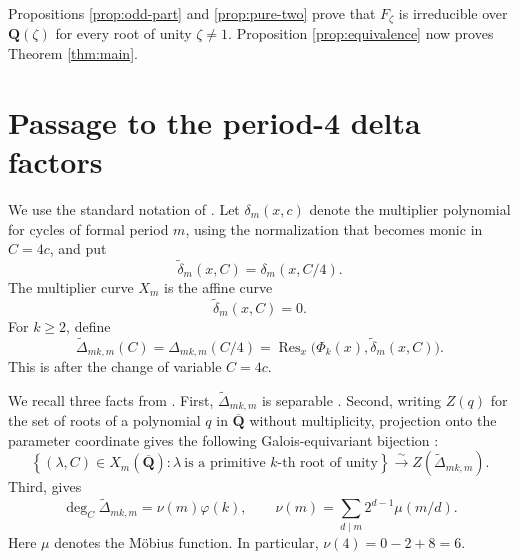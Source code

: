 \documentclass[11pt]{article}
\newcommand{\Q}{\mathbf Q}
\newcommand{\Res}{\operatorname{Res}}
\begin{document}
Propositions \ref{prop:odd-part} and \ref{prop:pure-two} prove that
$F_\zeta$ is irreducible over $\Q(\zeta)$ for every root of unity
$\zeta\neq1$.  Proposition \ref{prop:equivalence} now proves
Theorem \ref{thm:main}.

\section{Passage to the period-4 delta factors}

We use the standard notation of
\cite{Morton1996,MortonVivaldi1995,KoizumiMurakamiSanoTakehira2025}.  Let
$\delta_m(x,c)$ denote the multiplier polynomial for cycles of formal
period $m$, using the normalization that becomes monic in $C=4c$, and
put
\[
 \widetilde\delta_m(x,C)=\delta_m(x,C/4).
\]
The multiplier curve $X_m$ is the affine curve
\[
 \widetilde\delta_m(x,C)=0.
\]
For $k\geq2$, define
\[
 \widetilde\Delta_{mk,m}(C)=\Delta_{mk,m}(C/4)
 =\Res_x\bigl(\Phi_k(x),\widetilde\delta_m(x,C)\bigr).
\]
This is \cite[Equation (1.4)]{KoizumiMurakamiSanoTakehira2025} after
the change of variable $C=4c$.

We recall three facts from
\cite{KoizumiMurakamiSanoTakehira2025}.  First,
$\widetilde\Delta_{mk,m}$ is separable
\cite[Proposition 2.3]{KoizumiMurakamiSanoTakehira2025}.  Second,
writing $Z(q)$ for the set of roots of a polynomial $q$ in
$\overline{\Q}$ without multiplicity, projection onto the parameter
coordinate gives the
following Galois-equivariant bijection
\cite[Equation (2.2)]{KoizumiMurakamiSanoTakehira2025}:
\begin{equation}\label{eq:delta-bijection}
 \left\{(\lambda,C)\in X_m(\overline{\Q}):
       \lambda\ \text{is a primitive $k$-th root of unity}\right\}
 \xrightarrow{\ \sim\ }
 Z(\widetilde\Delta_{mk,m}).
\end{equation}
Third, \cite[Equation (1.6)]{KoizumiMurakamiSanoTakehira2025} gives
\begin{equation}\label{eq:delta-degree}
 \deg_C\widetilde\Delta_{mk,m}=\nu(m)\varphi(k),
 \qquad
 \nu(m)=\sum_{d\mid m}2^{d-1}\mu(m/d).
\end{equation}
Here $\mu$ denotes the M\"obius function.
In particular, $\nu(4)=0-2+8=6$.
\end{document}
